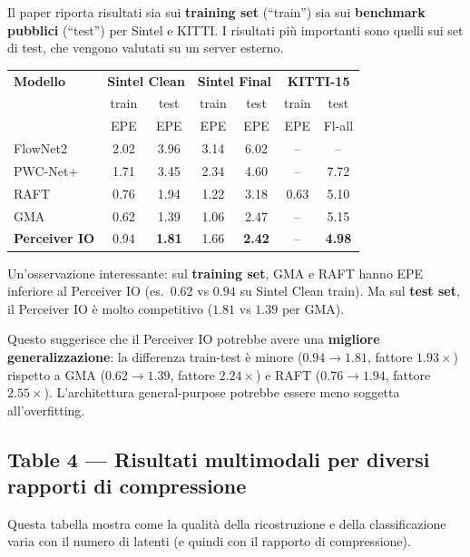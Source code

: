 \documentclass[12pt,a4paper]{article}
\begin{document}
Il paper riporta risultati sia sui \textbf{training set} (``train'') sia sui \textbf{benchmark pubblici} (``test'') per Sintel e KITTI. I risultati pi\`u importanti sono quelli sui set di test, che vengono valutati su un server esterno.

\begin{center}
\begin{tabular}{lcccccc}
\toprule
\textbf{Modello} & \multicolumn{2}{c}{\textbf{Sintel Clean}} & \multicolumn{2}{c}{\textbf{Sintel Final}} & \multicolumn{2}{c}{\textbf{KITTI-15}} \\
 & train & test & train & test & train & test \\
 & EPE & EPE & EPE & EPE & EPE & Fl-all \\
\midrule
FlowNet2 & 2.02 & 3.96 & 3.14 & 6.02 & -- & -- \\
PWC-Net+ & 1.71 & 3.45 & 2.34 & 4.60 & -- & 7.72 \\
RAFT & 0.76 & 1.94 & 1.22 & 3.18 & 0.63 & 5.10 \\
GMA & 0.62 & 1.39 & 1.06 & 2.47 & -- & 5.15 \\
\midrule
\textbf{Perceiver IO} & 0.94 & \textbf{1.81} & 1.66 & \textbf{2.42} & -- & \textbf{4.98} \\
\bottomrule
\end{tabular}
\end{center}

\begin{notabox}
Un'osservazione interessante: sul \textbf{training set}, GMA e RAFT hanno EPE inferiore al Perceiver IO (es.\ $0.62$ vs $0.94$ su Sintel Clean train). Ma sul \textbf{test set}, il Perceiver IO \`e molto competitivo ($1.81$ vs $1.39$ per GMA).

Questo suggerisce che il Perceiver IO potrebbe avere una \textbf{migliore generalizzazione}: la differenza train-test \`e minore ($0.94 \to 1.81$, fattore $1.93\times$) rispetto a GMA ($0.62 \to 1.39$, fattore $2.24\times$) e RAFT ($0.76 \to 1.94$, fattore $2.55\times$). L'architettura general-purpose potrebbe essere meno soggetta all'overfitting.
\end{notabox}

\subsection{Table 4 --- Risultati multimodali per diversi rapporti di compressione}

Questa tabella mostra come la qualit\`a della ricostruzione e della classificazione varia con il numero di latenti (e quindi con il rapporto di compressione).
\end{document}
